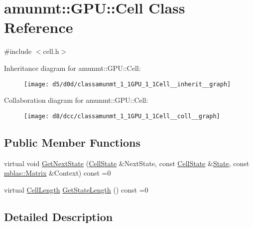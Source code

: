 \hypertarget{classamunmt_1_1GPU_1_1Cell}{}\section{amunmt\+:\+:G\+PU\+:\+:Cell Class Reference}
\label{classamunmt_1_1GPU_1_1Cell}


{\ttfamily \#include $<$cell.\+h$>$}



Inheritance diagram for amunmt\+:\+:G\+PU\+:\+:Cell\+:
\nopagebreak
\begin{figure}[H]
\begin{center}
\leavevmode
\texttt{[image: d5/d0d/classamunmt\_1\_1GPU\_1\_1Cell\_\_inherit\_\_graph]}
\end{center}
\end{figure}


Collaboration diagram for amunmt\+:\+:G\+PU\+:\+:Cell\+:
\nopagebreak
\begin{figure}[H]
\begin{center}
\leavevmode
\texttt{[image: d8/dcc/classamunmt\_1\_1GPU\_1\_1Cell\_\_coll\_\_graph]}
\end{center}
\end{figure}
\subsection*{Public Member Functions}
\begin{DoxyCompactItemize}
\item 
virtual void \hyperlink{classamunmt_1_1GPU_1_1Cell_a16d5711472cd8bdef9652d7a71a1f403}{Get\+Next\+State} (\hyperlink{structamunmt_1_1GPU_1_1CellState}{Cell\+State} \&Next\+State, const \hyperlink{structamunmt_1_1GPU_1_1CellState}{Cell\+State} \&\hyperlink{classamunmt_1_1State}{State}, const \hyperlink{namespaceamunmt_1_1GPU_1_1mblas_ab67821a8254de53e45a623cf73c0aef6}{mblas\+::\+Matrix} \&Context) const =0
\item 
virtual \hyperlink{structamunmt_1_1GPU_1_1CellLength}{Cell\+Length} \hyperlink{classamunmt_1_1GPU_1_1Cell_a3ed600cc046f7428d6529a7c0cd3ae89}{Get\+State\+Length} () const =0
\end{DoxyCompactItemize}


\subsection{Detailed Description}



